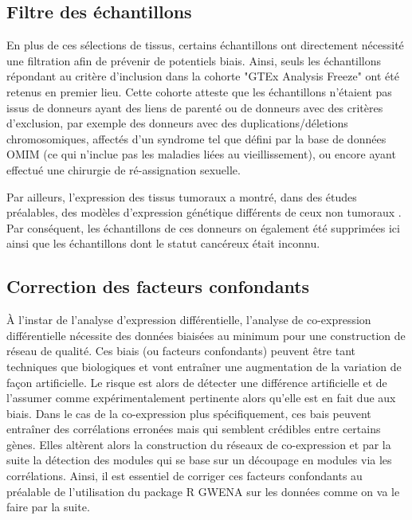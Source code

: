 \subsection{Filtre des échantillons}


En plus de ces sélections de tissus, certains échantillons ont directement nécessité une filtration afin de prévenir de potentiels biais. Ainsi, seuls les échantillons répondant au critère d'inclusion dans la cohorte "GTEx Analysis Freeze" ont été retenus en premier lieu. Cette cohorte atteste que les échantillons n'étaient pas issus de donneurs ayant des liens de parenté ou de donneurs avec des critères d'exclusion, par exemple des donneurs avec des duplications/déletions chromosomiques, affectés d'un syndrome tel que défini par la base de données OMIM \cite{Hamosh2005} (ce qui n'inclue pas les maladies liées au vieillissement), ou encore ayant effectué une chirurgie de ré-assignation sexuelle. 

Par ailleurs, l'expression des tissus tumoraux a montré, dans des études préalables, des modèles d'expression génétique différents de ceux non tumoraux \cite{Tang2017}. Par conséquent, les échantillons de ces donneurs on également été supprimées ici ainsi que les échantillons dont le statut cancéreux était inconnu. 


\subsection{Correction des facteurs confondants}

À l'instar de l'analyse d'expression différentielle, l'analyse de co-expression différentielle nécessite des données biaisées au minimum pour une construction de réseau de qualité. Ces biais (ou facteurs confondants) peuvent être tant techniques que biologiques et vont entraîner une augmentation de la variation de façon artificielle. Le risque est alors de détecter une différence artificielle et de l'assumer comme expérimentalement pertinente alors qu'elle est en fait due aux biais. Dans le cas de la co-expression plus spécifiquement, ces bais peuvent entraîner des corrélations erronées mais qui semblent crédibles entre certains gènes. Elles altèrent alors la construction du réseaux de co-expression et par la suite la détection des modules qui se base sur un découpage en modules via les corrélations. Ainsi, il est essentiel de corriger ces facteurs confondants au préalable de l'utilisation du package R GWENA  sur les données comme on va le faire par la suite.

